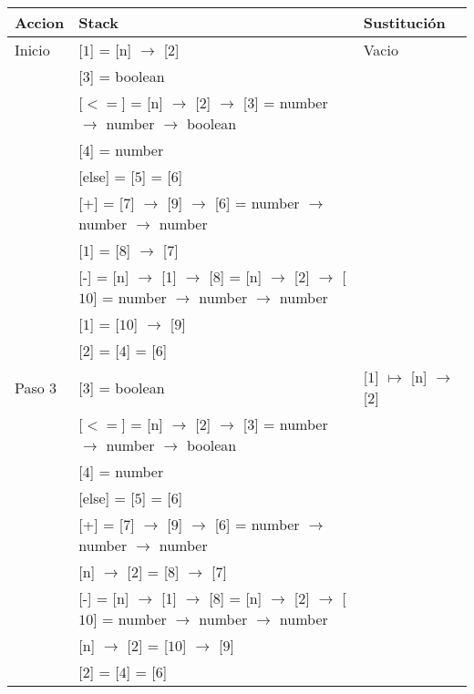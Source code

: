 \documentclass{article}
\begin{document}
\begin{center}
 \begin{longtable}{ | l | p{10 cm} | p{5 cm} | }
  \hline
  Accion & Stack & Sustitución \\ \hline \hline
  Inicio & [$\boxed{1}$] = [n] $\rightarrow$ [$\boxed{2}$] 									& Vacio	\\
	 & [$\boxed{3}$] = boolean		     										&   	\\
	 & [$<=$] = [n] $\rightarrow$ [2] $\rightarrow$ [$\boxed{3}$] = 
	 number $\rightarrow$ number $\rightarrow$ boolean									& 	\\ 
	 & [$\boxed{4}$] = number												&	\\ 
	 & [else] = [$\boxed{5}$] = [$\boxed{6}$]										&	\\
	 & [+] = [$\boxed{7}$] $\rightarrow$ [$\boxed{9}$] $\rightarrow$ [$\boxed{6}$] = 
	 number $\rightarrow$ number $\rightarrow$ number									&	\\ 
	 & [$\boxed{1}$] = [$\boxed{8}$] $\rightarrow$ [$\boxed{7}$]								&	\\
	 & [-] = [n] $\rightarrow$ [1] $\rightarrow$ [$\boxed{8}$] = [n] $\rightarrow$ [2] $\rightarrow$ [$\boxed{10}$] =
	   number $\rightarrow$ number $\rightarrow$ number									&	\\
	 & [$\boxed{1}$] = [$\boxed{10}$] $\rightarrow$ [$\boxed{9}$] 								&	\\ 
	 & [$\boxed{2}$] = [$\boxed{4}$] = [$\boxed{6}$]									&	\\ \hline
	 
  Paso 3 & [$\boxed{3}$] = boolean		     										& [$\boxed{1}$] $\mapsto$ [n] $\rightarrow$ [$\boxed{2}$]  \\
	 & [$<=$] = [n] $\rightarrow$ [2] $\rightarrow$ [$\boxed{3}$] = 
	 number $\rightarrow$ number $\rightarrow$ boolean									& 	\\ 
	 & [$\boxed{4}$] = number												&	\\ 
	 & [else] = [$\boxed{5}$] = [$\boxed{6}$]										&	\\
	 & [+] = [$\boxed{7}$] $\rightarrow$ [$\boxed{9}$] $\rightarrow$ [$\boxed{6}$] = 
	 number $\rightarrow$ number $\rightarrow$ number									&	\\ 
	 & [n] $\rightarrow$ [$\boxed{2}$] = [$\boxed{8}$] $\rightarrow$ [$\boxed{7}$]						&	\\
	 & [-] = [n] $\rightarrow$ [1] $\rightarrow$ [$\boxed{8}$] = [n] $\rightarrow$ [2] $\rightarrow$ [$\boxed{10}$] =
	   number $\rightarrow$ number $\rightarrow$ number									&	\\
	 & [n] $\rightarrow$ [$\boxed{2}$] = [$\boxed{10}$] $\rightarrow$ [$\boxed{9}$] 					&	\\ 
	 & [$\boxed{2}$] = [$\boxed{4}$] = [$\boxed{6}$]									&	\\ \hline
	 

\end{longtable}
\end{center}
\end{document}
